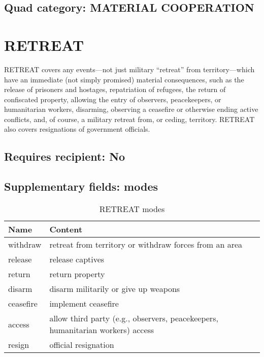 \documentclass[11pt]{report}
\newcommand{\plcat}[1]{\textsf{#1}}
\begin{document}
\subsection{Quad category: MATERIAL COOPERATION}

\newpage

\section{RETREAT}

\plcat{RETREAT} covers any events---not just military ``retreat'' from territory---which have an immediate (not simply promised) material consequences, such as the release of prisoners and hostages, repatriation of refugees, the return of  confiscated property, allowing the entry of observers, peacekeepers, or humanitarian workers, disarming, observing a ceasefire or otherwise ending active conflicts, and, of course, a military retreat from, or ceding, territory. \plcat{RETREAT} also covers resignations of government officials.

\subsection{Requires recipient: No}

\subsection{Supplementary fields: modes}

\begin{table}[htp]
\caption{RETREAT modes}
\begin{center}
\begin{tabular}{|l|p{13cm}|}
\hline
Name & Content \\
\hline
withdraw & retreat from territory or withdraw forces from an area\\
release & release captives \\
return & return property \\
disarm & disarm militarily or give up weapons\\ 
ceasefire & implement ceasefire\\
access & allow third party (e.g., observers, peacekeepers, humanitarian workers) access \\
resign & official resignation \\
\hline
\end{tabular}
\end{center}
\label{tab:retreatmode}
\end{table}%
\end{document}
